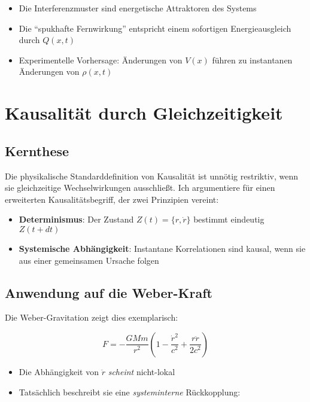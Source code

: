 \begin{itemize}
\item Die Interferenzmuster sind energetische Attraktoren des Systems
\item Die \enquote{spukhafte Fernwirkung} entspricht einem sofortigen Energieausgleich durch $Q(x,t)$
\item Experimentelle Vorhersage: Änderungen von $V(x)$ führen zu instantanen Änderungen von $\rho(x,t)$
\end{itemize}

\section{Kausalität durch Gleichzeitigkeit}
\label{sec:gleichzeitige_kausalitaet}

\subsection{Kernthese}
Die physikalische Standarddefinition von Kausalität ist unnötig restriktiv, wenn sie gleichzeitige Wechselwirkungen ausschließt. Ich argumentiere für einen erweiterten Kausalitätsbegriff, der zwei Prinzipien vereint:

\begin{itemize}
    \item \textbf{Determinismus}: Der Zustand $Z(t) = \{r, \dot{r}\}$ bestimmt eindeutig $Z(t+dt)$
    \item \textbf{Systemische Abhängigkeit}: Instantane Korrelationen sind kausal, wenn sie aus einer gemeinsamen Ursache folgen
\end{itemize}

\subsection{Anwendung auf die Weber-Kraft}
Die Weber-Gravitation zeigt dies exemplarisch:

\begin{equation}
    F = -\frac{GMm}{r^2}\left(1 - \frac{\dot{r}^2}{c^2} + \frac{r\ddot{r}}{2c^2}\right)
\end{equation}

\begin{itemize}
    \item Die Abhängigkeit von $\ddot{r}$ \textit{scheint} nicht-lokal
    \item Tatsächlich beschreibt sie eine \textit{systeminterne} Rückkopplung:
\end{itemize}

